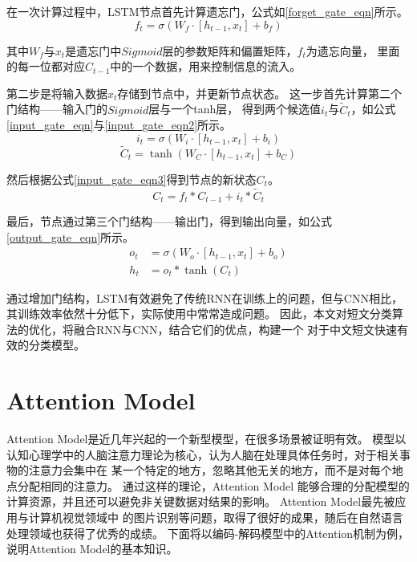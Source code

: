 \documentclass{standalone}
\begin{document}
在一次计算过程中，LSTM节点首先计算遗忘门，公式如\ref{forget_gate_eqn}所示。
\begin{equation}
    f_t=\sigma\left ( W_f \cdot [h_{t-1},x_t]+b_f \right )
    \label{forget_gate_eqn}
\end{equation}

其中$W_f$与$x_t$是遗忘门中$Sigmoid$层的参数矩阵和偏置矩阵，$f_t$为遗忘向量，
里面的每一位都对应$C_{t-1}$中的一个数据，用来控制信息的流入。

第二步是将输入数据$x_t$存储到节点中，并更新节点状态。
这一步首先计算第二个门结构——输入门的$Sigmoid$层与一个tanh层，
得到两个候选值$i_t$与$\tilde{C}_t$，如公式\ref{input_gate_eqn}与\ref{input_gate_eqn2}所示。
\begin{equation}
    i_t=\sigma\left ( W_i \cdot [h_{t-1},x_t]+b_i \right )
    \label{input_gate_eqn}
\end{equation}
\begin{equation}
    \tilde{C}_t=\tanh\left ( W_C \cdot [h_{t-1},x_t]+b_C \right )
    \label{input_gate_eqn2}
\end{equation}

然后根据公式\ref{input_gate_eqn3}得到节点的新状态$C_t$。
\begin{equation}
    C_t=f_t \ast C_{t-1} + i_t \ast \tilde{C}_t 
    \label{input_gate_eqn3}
\end{equation}

最后，节点通过第三个门结构——输出门，得到输出向量，如公式\ref{output_gate_eqn}所示。
\begin{equation}
    \begin{split}
        o_t&=\sigma\left ( W_o \cdot [h_{t-1},x_t]+b_o \right ) \\
        h_t &= o_t \ast \tanh\left ( C_t \right )
    \end{split}
    \label{output_gate_eqn}
\end{equation}

通过增加门结构，LSTM有效避免了传统RNN在训练上的问题，但与CNN相比，
其训练效率依然十分低下，实际使用中常常造成问题。
因此，本文对短文分类算法的优化，将融合RNN与CNN，结合它们的优点，构建一个
对于中文短文快速有效的分类模型。

\section{Attention Model}
Attention Model是近几年兴起的一个新型模型，在很多场景被证明有效。
模型以认知心理学中的人脑注意力理论为核心，认为人脑在处理具体任务时，对于相关事物的注意力会集中在
某一个特定的地方，忽略其他无关的地方，而不是对每个地点分配相同的注意力。
通过这样的理论，Attention Model
能够合理的分配模型的计算资源，并且还可以避免非关键数据对结果的影响。
Attention Model最先被应用与计算机视觉领域中
的图片识别等问题，取得了很好的成果，随后在自然语言处理领域也获得了优秀的成绩。
\iffalse
下面将以编码-解码模型中的Attention机制为例，
说明Attention Model的基本知识。
\end{document}
